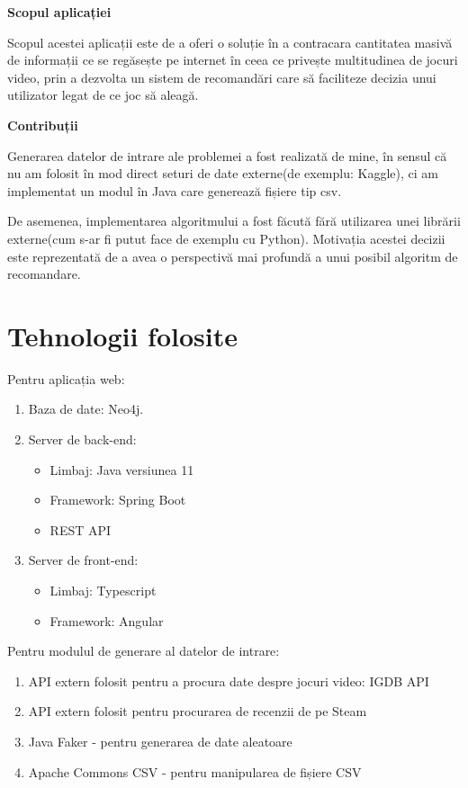 \documentclass[12pt,a4paper]{report}
\begin{document}
\bigskip
\textbf{Scopul aplicației}
\bigskip

Scopul acestei aplicații este de a oferi o soluție în a contracara cantitatea masivă de informații ce se regăsește pe internet \cite{5} în ceea ce privește multitudinea de jocuri video, prin a dezvolta un sistem de recomandări care să faciliteze decizia unui utilizator legat de ce joc să aleagă.

\bigskip
\textbf{Contribuții}
\bigskip  

Generarea datelor de intrare ale problemei a fost realizată de mine, în sensul că nu am folosit în mod direct seturi de date externe(de exemplu: Kaggle), ci am implementat un modul în Java care generează fișiere tip csv.

De asemenea, implementarea algoritmului a fost făcută fără utilizarea unei librării externe(cum s-ar fi putut face de exemplu cu Python). Motivația acestei decizii este reprezentată de a avea o perspectivă mai profundă a unui posibil algoritm de recomandare.

\section{Tehnologii folosite}

Pentru aplicația web:

\begin{enumerate}
  \item Baza de date: Neo4j.
  \item Server de back-end:
  \begin{itemize}
     \item Limbaj: Java versiunea 11
     \item Framework: Spring Boot
     \item REST API
   \end{itemize}
  \item Server de front-end:
  \begin{itemize}
     \item Limbaj: Typescript
     \item Framework: Angular
   \end{itemize}
\end{enumerate}
Pentru modulul de generare al datelor de intrare:

\begin{enumerate}
  \item API extern folosit pentru a procura date despre jocuri video: IGDB API \cite{1}
  \item API extern folosit pentru procurarea de recenzii de pe Steam \cite{2}
  \item Java Faker - pentru generarea de date aleatoare \cite{3}
  \item Apache Commons CSV - pentru manipularea de fișiere CSV \cite{4}
\end{enumerate}
\end{document}
